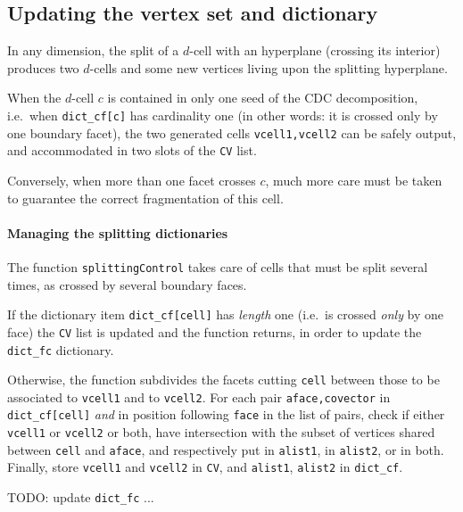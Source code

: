 \documentclass[11pt,oneside]{article}	%
\begin{document}
\subsection{Updating the vertex set and dictionary}

In any dimension, the split of a $d$-cell with an hyperplane (crossing its interior) produces two $d$-cells and some new vertices living upon the splitting hyperplane.

When the $d$-cell $c$ is contained in only one seed of the CDC decomposition, i.e.~when \texttt{dict\_cf[c]} has cardinality one (in other words: it is crossed only by one boundary facet), the two generated cells \texttt{vcell1,vcell2} can be safely output, and accommodated in two slots of the \texttt{CV} list.

Conversely, when more than one facet crosses $c$, much more care must be taken to guarantee the correct fragmentation of this cell.


\paragraph{Managing the splitting dictionaries}
The function \texttt{splittingControl} takes care of cells that must be split several times, as crossed by several boundary faces. 

If the dictionary item \texttt{dict\_cf[cell]} has \emph{length} one (i.e.~is crossed  \emph{only} by one face) the \texttt{CV} list is updated and the function returns, in order to update the \texttt{dict\_fc} dictionary.

Otherwise, the function subdivides the facets cutting \texttt{cell} between those to be associated to \texttt{vcell1} and to \texttt{vcell2}. 
For each pair \texttt{aface,covector} in \texttt{dict\_cf[cell]} \emph{and} in position following \texttt{face} in the list of pairs, check if either \texttt{vcell1} or \texttt{vcell2} or both, have intersection with the subset of vertices shared between \texttt{cell} and \texttt{aface}, and respectively put in \texttt{alist1}, in \texttt{alist2}, or in both.
Finally, store \texttt{vcell1} and \texttt{vcell2} in \texttt{CV}, and \texttt{alist1}, \texttt{alist2} in \texttt{dict\_cf}.

TODO: update \texttt{dict\_fc} ...
\end{document}
